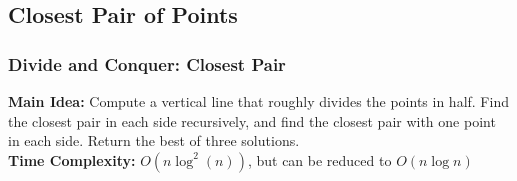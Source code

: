 \documentclass{beamer}
\begin{document}
\begin{frame}
    \begin{center}
    \end{center}
\end{frame}

\subsection{Closest Pair of Points}
\begin{frame}
    \frametitle{Divide and Conquer: Closest Pair}
    \textbf{Main Idea:} Compute a vertical line that roughly divides the points in half. Find the closest pair in each side recursively, and find the closest pair with one point in each side. Return the best of three solutions. \\[1em]
    \textbf{Time Complexity:} $O(n \log^2(n))$, but can be reduced to $O(n \log n)$
\end{frame}
\end{document}
